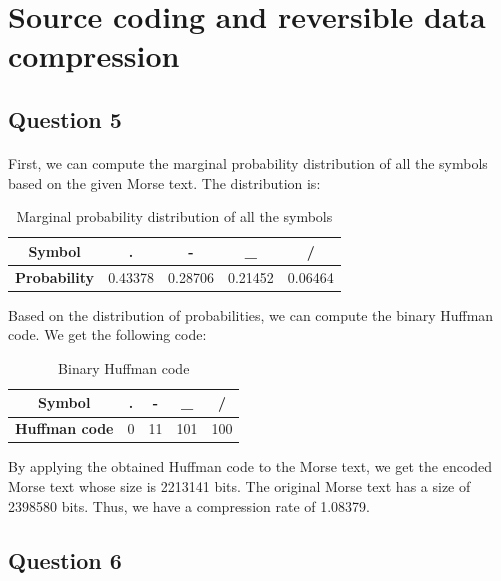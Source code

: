 \documentclass[a4paper, 11pt, oneside]{article}
\begin{document}
\section{Source coding and reversible data compression}

\subsection{Question 5}
\paragraph{}First, we can compute the marginal probability distribution of all the symbols based on the given Morse text. The distribution is:
\begin{table}[H]
    \centering
    \begin{tabular}{|c|c|c|c|c|}
    \hline
    \textbf{Symbol}      & . & - & \_ & / \\ \hline
    \textbf{Probability} & 0.43378 & 0.28706 & 0.21452 & 0.06464 \\ \hline
    \end{tabular}
    \caption{Marginal probability distribution of all the symbols}
\end{table}
Based on the distribution of probabilities, we can compute the binary Huffman code. We get the following code:
\begin{table}[H]
    \centering
    \begin{tabular}{|c|c|c|c|c|}
    \hline
    \textbf{Symbol}      & . & - & \_ & / \\ \hline
    \textbf{Huffman code} & 0 & 11 & 101 & 100 \\ \hline
    \end{tabular}
    \caption{Binary Huffman code}
\end{table}
By applying the obtained Huffman code to the Morse text, we get the encoded Morse text whose size is 2213141 bits. The original Morse text has a size of 2398580 bits. Thus, we have a compression rate of 1.08379.


\subsection{Question 6}
\end{document}
